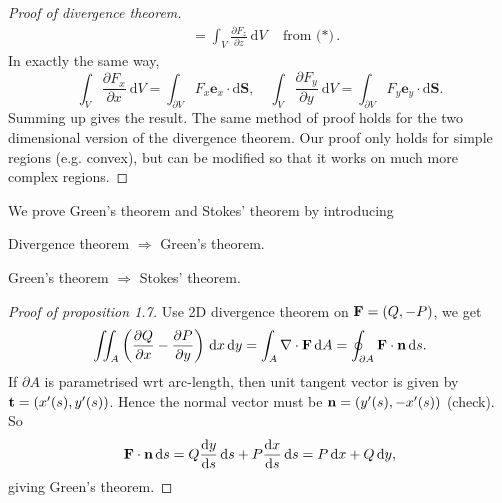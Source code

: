 \begin{proof}[Proof of divergence theorem]
\begin{align*}
        &=\int_{V} \frac{\partial F_{z}}{\partial z} \mathrm{~d} V\quad \text{from ($*$)} .
    \end{align*}
    In exactly the same way, 
    \[
        \int_{V} \frac{\partial F_{x}}{\partial x} \mathrm{~d} V=\int_{\partial V} F_{x} \mathbf{e}_{x} \cdot \mathrm{d} \mathbf{S}, \quad \int_{V} \frac{\partial F_{y}}{\partial y} \mathrm{~d} V=\int_{\partial V} F_{y} \mathbf{e}_{y} \cdot \mathrm{d} \mathbf{S} .
    \]
    Summing up gives the result. The same method of proof holds for the two dimensional version of the divergence theorem. Our proof only holds for simple regions (e.g. convex), but can be modified so that it works on much more complex regions.
\end{proof}

We prove Green's theorem and Stokes' theorem by introducing 
\begin{proposition}
    Divergence theorem $ \Longrightarrow  $ Green's theorem.
\end{proposition}
\begin{proposition}
    Green's theorem $ \Longrightarrow  $ Stokes' theorem.
\end{proposition}
\begin{proof}[Proof of proposition 1.7]
    Use 2D divergence theorem on $ {\bf F} = (Q,-P) $, we get 
    \[
        \iint_{A} \left( \frac{\partial Q}{\partial x}-\frac{\partial P}{\partial y}   \right)\,\mathrm{d} x\,\mathrm{d} y = \int_{A} \nabla\cdot{\bf F} \,\mathrm{d}A  = \oint_{\partial A} {\bf F} \cdot \mathbf{n}\,\mathrm{d} s.
    \]
    If $ \partial A $ is parametrised wrt arc-length, then unit tangent vector is given by $ {\bf t}=(x'(s),y'(s)) $. Hence the normal vector must be $ {\bf n} = (y'(s),-x'(s)) $ (check). So 
    \[
        {\bf F} \cdot \mathbf{n} \,\mathrm{d} s = Q \frac{\mathrm{d}y}{\mathrm{d}s}\,\mathrm{d} s+ P \frac{\mathrm{d}x}{\mathrm{d}s}\,\mathrm{d} s = P\,\mathrm{d} x+Q\,\mathrm{d} y,
    \]
    giving Green's theorem.
\end{proof}
